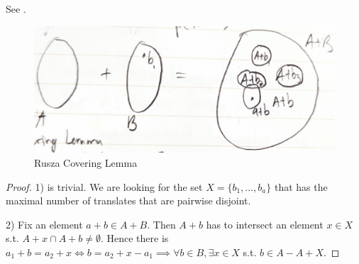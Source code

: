 \documentclass[a4paper]{article}
\begin{document}
See .

\begin{figure}[ht]
	\centering
	\includegraphics[width=.5\textwidth]{Rusza_covering}
	\caption{Rusza Covering Lemma \label{fig:Rusza_covering}}
\end{figure}

\begin{proof}
	1) is trivial.
	We are looking for the set $X = \{b_{1},\ldots, b_a\}$ that has the maximal number of translates that are pairwise disjoint.

	2) Fix an element $a+b \in A+ B $.
	Then $A + b $ has to intersect an element $x \in X $ s.t. $A+x \cap A+b \ne \emptyset $.
	Hence there is $a_{1} + b = a_{2} + x \iff b = a_{2}+x-a_{1} \implies \forall b \in B, \exists x \in X$ s.t. $b \in A - A + X$.
\end{proof}
\end{document}
